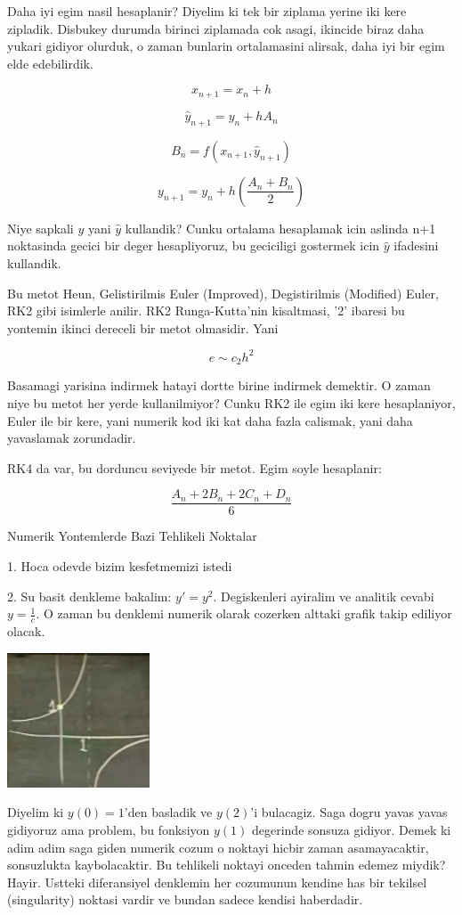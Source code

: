 \documentclass[12pt,fleqn]{article}\usepackage{../common}
\begin{document}
Daha iyi egim nasil hesaplanir? Diyelim ki tek bir ziplama yerine iki kere
zipladik. Disbukey durumda birinci ziplamada cok asagi, ikincide biraz daha
yukari gidiyor olurduk, o zaman bunlarin ortalamasini alirsak, daha iyi bir egim
elde edebilirdik. 

\[ x_{n+1} = x_n + h \]

\[ \hat{y}_{n+1} = y_n + h A_n \]

\[ B_n = f(x_{n+1},\hat{y}_{n+1}) \]

\[ y_{n+1} = y_n + h(\frac{A_n+B_n}{2}) \]

Niye sapkali $y$ yani $\hat{y}$ kullandik? Cunku ortalama hesaplamak icin
aslinda n+1 noktasinda gecici bir deger hesapliyoruz, bu geciciligi gostermek
icin $\hat{y}$ ifadesini kullandik.

Bu metot Heun, Gelistirilmis Euler (Improved), Degistirilmis (Modified) Euler, RK2
gibi isimlerle anilir. RK2 Runga-Kutta'nin kisaltmasi, '2' ibaresi bu yontemin
ikinci dereceli bir metot olmasidir. Yani 

\[ e \sim c_2 h^2 \]

Basamagi yarisina indirmek hatayi dortte birine indirmek demektir. O zaman niye
bu metot her yerde kullanilmiyor? Cunku RK2 ile egim iki kere hesaplaniyor,
Euler ile bir kere, yani numerik kod iki kat daha fazla calismak, yani daha
yavaslamak zorundadir. 

RK4 da var, bu dorduncu seviyede bir metot. Egim soyle hesaplanir:

\[ \frac{A_n + 2B_n + 2C_n + D_n}{6} \]

Numerik Yontemlerde Bazi Tehlikeli Noktalar

1. Hoca odevde bizim kesfetmemizi istedi

2. Su basit denkleme bakalim: $y' = y^2$. Degiskenleri ayiralim ve analitik cevabi
$y=\frac{1}{c}$. O zaman bu denklemi numerik olarak cozerken alttaki grafik
takip ediliyor olacak.

\includegraphics[height=4cm]{2_5.png}

Diyelim ki $y(0) = 1$'den basladik ve $y(2)$'i bulacagiz. Saga dogru yavas yavas
gidiyoruz ama problem, bu fonksiyon $y(1)$ degerinde sonsuza gidiyor. Demek ki
adim adim saga giden numerik cozum o noktayi hicbir zaman
asamayacaktir, sonsuzlukta kaybolacaktir. Bu tehlikeli noktayi onceden tahmin
edemez miydik? Hayir. Ustteki diferansiyel denklemin her cozumunun kendine has
bir tekilsel (singularity) noktasi vardir ve bundan sadece kendisi
haberdadir. 
\end{document}
